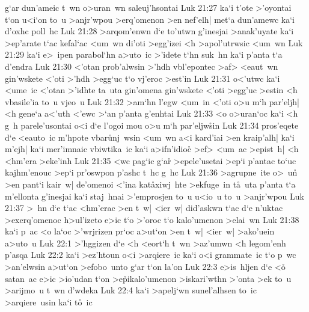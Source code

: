 g`ar
dun'ameic
t~wn
o>uran~wn
saleuj'hsontai\bibvsend
\vs Luk 21:27
ka`i
t'ote
>'oyontai
t`on
u<i`on
to~u
>anjr'wpou
>erq'omenon
>en
nef'elh|
met`a
dun'amewc
ka`i
d'oxhc
poll~hc\bibvsend
\vs Luk 21:28
>arqom'enwn
d`e
to'utwn
g'inesjai
>anak'uyate
ka`i
>ep'arate
t`ac
kefal`ac
<um~wn
di'oti
>egg'izei
<h
>apol'utrwsic
<um~wn\bibvsend
\vs Luk 21:29
ka`i
e>~ipen
parabol`hn
a>uto~ic
>'idete
t`hn
suk~hn
ka`i
p'anta
t`a
d'endra\bibvsend
\vs Luk 21:30
<'otan
prob'alwsin
>'hdh
vbl'epontec
>af>
<eaut~wn
gin'wskete
<'oti
>'hdh
>egg`uc
t`o
vj'eroc
>est'in\bibvsend
\vs Luk 21:31
o<'utwc
ka`i
<ume~ic
<'otan
>'idhte
ta~uta
gin'omena
gin'wskete
<'oti
>egg'uc
>estin
<h
vbasile'ia
to~u
vjeo~u\bibvsend
\vs Luk 21:32
>am`hn
l'egw
<um~in
<'oti
o>u
m`h
par'eljh|
<h
gene`a
a<'uth
<'ewc
>`an
p'anta
g'enhtai\bibvsend
\vs Luk 21:33
<o
o>uran`oc
ka`i
<h
g~h
parele'usontai
o<i
d`e
l'ogoi
mou
o>u
m`h
par'eljw\r{s}in\bibvsend
{}
\vs Luk 21:34
pros'eqete
d`e
<eauto~ic
m'hpote
vbar\r{u}nj~wsin
<um~wn
a<i
kard'iai
>en
kraip'alh|
ka`i
m'ejh|
ka`i
mer'imnaic
vbiwtika~ic
ka`i
a>ifn'idioc\r{}
>ef>
<um~ac
>epist~h|
<h
<hm'era
>eke'inh\bibvsend
\vs Luk 21:35
<wc
pag`ic
g`ar\r{}
>epele'usetai
>ep`i
p'antac
to`uc
kajhm'enouc
>ep`i
pr'oswpon
p'ashc
t~hc
g~hc\bibvsend
\vs Luk 21:36
>agrupne~ite
o>~u\r{n}
>en
pant`i
kair~w|
de'omenoi
<'ina
kat\r{a}xiwj~hte
>ekfuge~in
t\r{a}~uta
p'anta
t`a
m'ellonta
g'inesjai
ka`i
staj~hnai
>'emprosjen
to~u
u<io~u
to~u
>anjr'wpou\bibvsend
\vs Luk 21:37
>~hn
d`e
t`ac
<hm'erac
>en
t~w|
<ier~w|
did'askwn
t`ac
d`e
n'uktac
>exerq'omenoc
h>ul'izeto
e>ic
t`o
>'oroc
t`o
kalo'umenon
>elai~wn\bibvsend
\vs Luk 21:38
ka`i
p~ac
<o
la`oc
>'wrjrizen
pr`oc
a>ut`on
>en
t~w|
<ier~w|
>ako'uein
a>uto~u\bibvsend
\vs Luk 22:1
>'hggizen
d`e
<h
<eort`h
t~wn
>az'umwn
<h
legom'enh
p'asqa\bibvsend
\vs Luk 22:2
ka`i
>ez'htoun
o<i
>arqiere~ic
ka`i
o<i
grammate~ic
t`o
p~wc
>an'elwsin
a>ut`on
>efobo~unto
g`ar
t`on
la'on\bibvsend
\vs Luk 22:3
e>is~hljen
d`e
<o\r{}
satan~ac
e>ic
>io'udan
t`on
>e\r{p}ikalo'umenon
>iskari'wthn
>'onta
>ek
to~u
>arijmo~u
t~wn
d'wdeka\bibvsend
\vs Luk 22:4
ka`i
>apelj`wn
sunel'alhsen
to~ic
>arqiere~usin
ka`i
t\r{o}~ic
